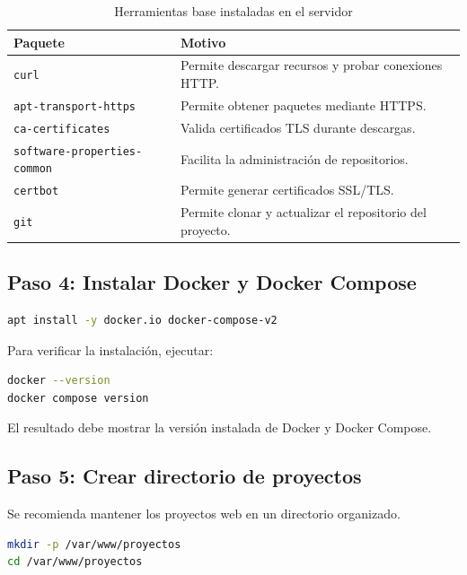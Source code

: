\documentclass[12pt,letterpaper]{article}
\newcommand{\code}[1]{\nolinkurl{#1}}
\begin{document}
\begin{longtable}{|p{}|p{}|}
\caption{Herramientas base instaladas en el servidor}\\
\hline
\textbf{Paquete} & \textbf{Motivo} \\
\hline
\code{curl} & Permite descargar recursos y probar conexiones HTTP. \\
\hline
\code{apt-transport-https} & Permite obtener paquetes mediante HTTPS. \\
\hline
\code{ca-certificates} & Valida certificados TLS durante descargas. \\
\hline
\code{software-properties-common} & Facilita la administración de repositorios. \\
\hline
\code{certbot} & Permite generar certificados SSL/TLS. \\
\hline
\code{git} & Permite clonar y actualizar el repositorio del proyecto. \\
\hline
\end{longtable}

\subsection{Paso 4: Instalar Docker y Docker Compose}

\begin{lstlisting}[language=bash]
apt install -y docker.io docker-compose-v2
\end{lstlisting}

Para verificar la instalación, ejecutar:

\begin{lstlisting}[language=bash]
docker --version
docker compose version
\end{lstlisting}

El resultado debe mostrar la versión instalada de Docker y Docker Compose.

\subsection{Paso 5: Crear directorio de proyectos}

Se recomienda mantener los proyectos web en un directorio organizado.

\begin{lstlisting}[language=bash]
mkdir -p /var/www/proyectos
cd /var/www/proyectos
\end{lstlisting}

\end{document}
